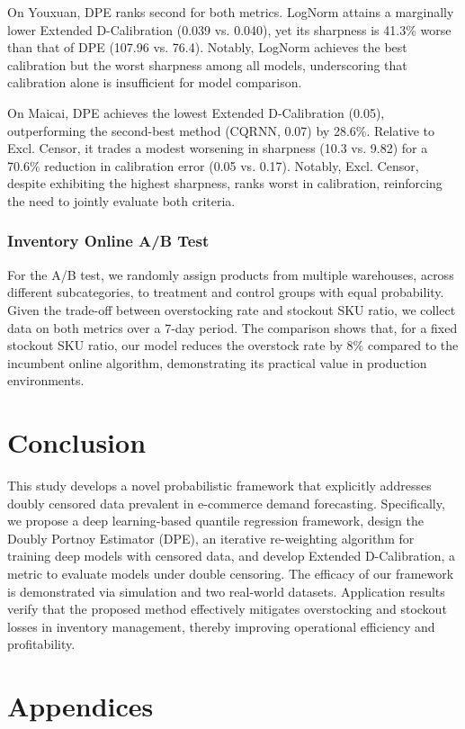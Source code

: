 \documentclass[sigconf]{acmart}
\begin{document}
On Youxuan, DPE ranks second for both metrics. LogNorm attains a marginally lower Extended D-Calibration (0.039 vs. 0.040), yet its sharpness is 41.3\% worse than that of DPE (107.96 vs. 76.4). Notably, LogNorm achieves the best calibration but the worst sharpness among all models, underscoring that calibration alone is insufficient for model comparison.

On Maicai, DPE achieves the lowest Extended D-Calibration (0.05), outperforming the second-best method (CQRNN, 0.07) by 28.6\%. Relative to Excl. Censor, it trades a modest worsening in sharpness (10.3 vs. 9.82) for a 70.6\% reduction in calibration error (0.05 vs. 0.17). Notably, Excl. Censor, despite exhibiting the highest sharpness, ranks worst in calibration, reinforcing the need to jointly evaluate both criteria.

\subsubsection{Inventory Online A/B Test}
For the A/B test, we randomly assign products from multiple warehouses, across different subcategories, to treatment and control groups with equal probability. Given the trade-off between overstocking rate and stockout SKU ratio, we collect data on both metrics over a 7-day period. The comparison shows that, for a fixed stockout SKU ratio, our model reduces the overstock rate by 8\% compared to the incumbent online algorithm, demonstrating its practical value in production environments.

\section{Conclusion}

This study develops a novel probabilistic framework that explicitly addresses doubly censored data prevalent in e-commerce demand forecasting. Specifically, we propose a deep learning-based quantile regression framework, design the Doubly Portnoy Estimator (DPE), an iterative re-weighting algorithm for training deep models with censored data, and develop Extended D-Calibration, a metric to evaluate models under double censoring. The efficacy of our framework is demonstrated via simulation and two real-world datasets. Application results verify that the proposed method effectively mitigates overstocking and stockout losses in inventory management, thereby improving operational efficiency and profitability.

\section{Appendices}
\end{document}
